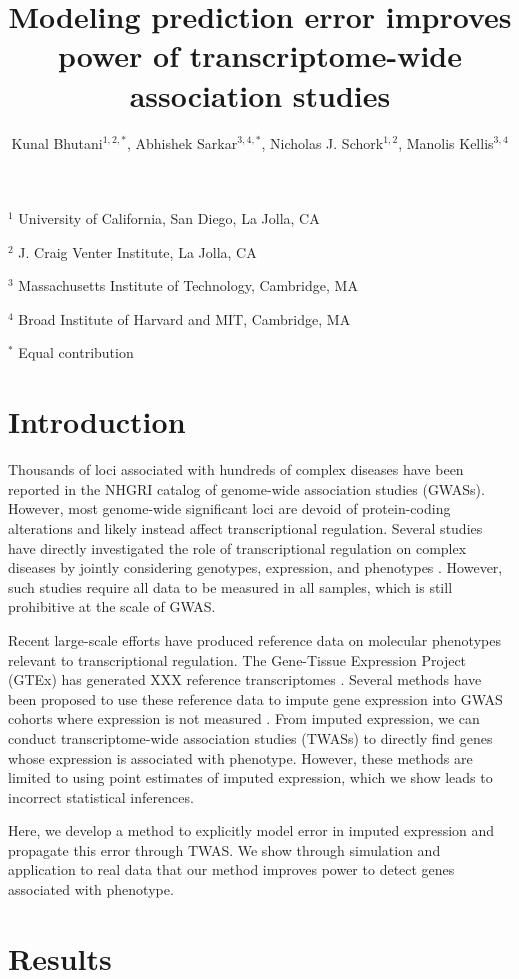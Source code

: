 \documentclass{article}
\author{Kunal Bhutani$^{1,2,*}$, Abhishek Sarkar$^{3,4,*}$, Nicholas J. Schork$^{1,2}$, Manolis Kellis$^{3,4}$}
\date{}
\title{Modeling prediction error improves power of transcriptome-wide association studies}
\begin{document}
\maketitle

$^1$ University of California, San Diego, La Jolla, CA

$^2$ J. Craig Venter Institute, La Jolla, CA

$^3$ Massachusetts Institute of Technology, Cambridge, MA

$^4$ Broad Institute of Harvard and MIT, Cambridge, MA

$^*$ Equal contribution

\section{Introduction}

Thousands of loci associated with hundreds of complex diseases have been
reported in the NHGRI catalog of genome-wide association studies
\cite{10.1093/nar/gkt1229} (GWASs). However, most genome-wide significant loci
are devoid of protein-coding alterations \cite{10.1073/pnas.0903103106} and
likely instead affect transcriptional regulation. Several studies have directly
investigated the role of transcriptional regulation on complex diseases by
jointly considering genotypes, expression, and phenotypes \cite{xxx}. However,
such studies require all data to be measured in all samples, which is still
prohibitive at the scale of GWAS.

Recent large-scale efforts have produced reference data on molecular phenotypes
relevant to transcriptional regulation. The Gene-Tissue Expression Project
(GTEx) has generated XXX reference transcriptomes
\cite{10.1126/science.1262110}. Several methods have been proposed to use these
reference data to impute gene expression into GWAS cohorts where expression is
not measured \cite{10.1038/ng.3367,10.1101/024083}. From imputed expression, we
can conduct transcriptome-wide association studies (TWASs) to directly find
genes whose expression is associated with phenotype. However, these methods
are limited to using point estimates of imputed expression, which we show leads
to incorrect statistical inferences.

Here, we develop a method to explicitly model error in imputed expression and
propagate this error through TWAS. We show through simulation and application
to real data that our method improves power to detect genes associated with
phenotype.

\section{Results}
\end{document}
